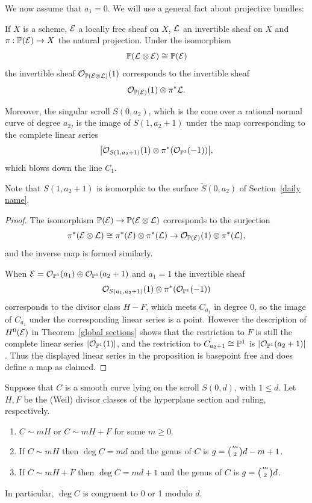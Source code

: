 %
We now assume that $a_{1} = 0$. We will use a general fact about
projective bundles:

\begin{proposition}\label{singular scrolls}
If $X$ is a scheme, ${\mathcal E}$ a locally free sheaf on $X$, ${\mathcal L}$ an invertible
sheaf on $X$
and $\pi: {\mathbb P}({\mathcal E})\to X$ the natural projection.
Under the isomorphism
$$
{\mathbb P}({\mathcal L} \otimes {\mathcal E})\cong {\mathbb P}({\mathcal E})
$$
the invertible sheaf ${\mathcal O}_{{\mathbb P}({\mathcal E}\otimes {\mathcal L})}(1)$ corresponds to the
invertible sheaf
$${\mathcal O}_{{\mathbb P}({\mathcal E})}(1)\otimes \pi^{*}{\mathcal L}.$$

Moreover, the singular scroll $S(0,a_{2})$, which is the cone over a
rational normal curve of degree $a_{2}$, is the image of
$S(1, a_{2}+1)$ under the map corresponding to the complete linear series
$$
\bigl|{\mathcal O}_{S(1, a_{2}+1)}(1) \otimes \pi^{*}({\mathcal O}_{{\mathbb P}^{1}}(-1))\bigr|,
$$
which 
blows down
%
the line $C_{1}$.
\unif
\end{proposition}

Note that $S(1,a_2+1)$ is isomorphic to the surface $\tilde S(0, a_2)$
of Section~\ref{daily name}.

\begin{proof}
The isomorphism ${\mathbb P}({\mathcal E}) \to {\mathbb P}({\mathcal E}\otimes {\mathcal L})$ corresponds to the
surjection
$$\pi^*({\mathcal E} \otimes{\mathcal L}) \cong \pi^*({\mathcal E}) \otimes \pi^*({\mathcal L}) \to
{\mathcal O}_{{\mathbb P}({\mathcal E})}(1) \otimes \pi^*({\mathcal L}),$$
and the inverse map is formed similarly.

When ${\mathcal E} = {\mathcal O}_{{\mathbb P}^1}(a_1)\oplus {\mathcal O}_{{\mathbb P}^1}(a_2+1)$ and $a_1 = 1$ the
invertible sheaf
$$
{\mathcal O}_{S(a_1, a_{2}+1)}(1) \otimes \pi^{*}({\mathcal O}_{{\mathbb P}^{1}}(-1))
$$
corresponds to the divisor class $H-F$, which meets $C_{a_1}$	in degree
0, so the image
of $C_{a_1}$ under the corresponding linear series is a point. However
the description of  $H^0({\mathcal E})$ in
Theorem~\ref{global sections} shows that the restriction to $F$
is still the complete linear series $|{\mathcal O}_{{\mathbb P}^1}(1)|$, and the
restriction to $C_{{a_2}+1}\cong {\mathbb P}^1$
is $|{\mathcal O}_{{\mathbb P}^1}(a_2+1)|$. Thus the displayed linear series in the
proposition is basepoint free and
does define a map as claimed.
\end{proof}

\begin{theorem}\label{curves on a singular scroll}
Suppose that $C$ is a smooth curve lying on the scroll $S(0,d)$, with
$1\leq d$. Let $H,F$ be the 
(Weil) divisor classes 
%
of the hyperplane
section and ruling, respectively.
\begin{enumerate}
\item $C\sim mH$ or $C\sim mH+F$ for some $m\geq 0$.
\item If $C\sim mH$ then $\deg C = md$ and the genus of $C$ is $g =
\tbinom{m}{2}d-m+1$.
\item If $C\sim mH+F$ then $\deg C = md+1$ and the genus of $C$ is $g =
\tbinom{m}{2}d$.
\end{enumerate}
In particular, $\deg C$ is congruent to 0 or 1 modulo $d$.
\unif
\end{theorem}

